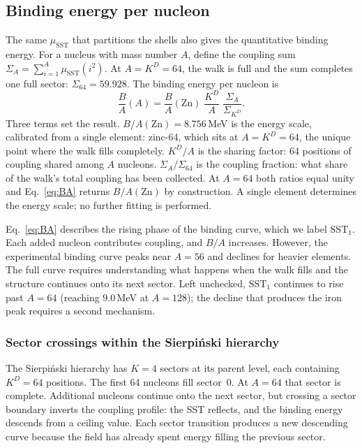 \documentclass[fleqn,usenatbib]{mnras}
\begin{document}
\subsection{Binding energy per nucleon}
\label{sec:binding}

The same $\mu_{\mathrm{SST}}$ that partitions the shells also gives the quantitative binding energy. For a nucleus with mass number $A$, define the coupling sum $\Sigma_A = \sum_{i=1}^{A}\mu_{\mathrm{SST}}(i^2)$. At $A = K^D = 64$, the walk is full and the sum completes one full sector: $\Sigma_{64} = 59.928$. The binding energy per nucleon is
\begin{equation}
\frac{B}{A}(A) = \frac{B}{A}(\mathrm{Zn})\;\frac{K^D}{A}\;\frac{\Sigma_A}{\Sigma_{K^D}}.
\label{eq:BA}
\end{equation}
Three terms set the result. $B/A(\mathrm{Zn}) = 8.756$\,MeV is the energy scale, calibrated from a single element: zinc-64, which sits at $A = K^D = 64$, the unique point where the walk fills completely. $K^D/A$ is the sharing factor: 64 positions of coupling shared among $A$ nucleons. $\Sigma_A/\Sigma_{64}$ is the coupling fraction: what share of the walk's total coupling has been collected. At $A = 64$ both ratios equal unity and Eq.~\ref{eq:BA} returns $B/A(\mathrm{Zn})$ by construction. A single element determines the energy scale; no further fitting is performed.

Eq.~\ref{eq:BA} describes the rising phase of the binding curve, which we label $\mathrm{SST}_1$. Each added nucleon contributes coupling, and $B/A$ increases. However, the experimental binding curve peaks near $A = 56$ and declines for heavier elements. The full curve requires understanding what happens when the walk fills and the structure continues onto its next sector. Left unchecked, $\mathrm{SST}_1$ continues to rise past $A = 64$ (reaching $9.0$\,MeV at $A = 128$); the decline that produces the iron peak requires a second mechanism.

\subsubsection{Sector crossings within the Sierpi\'nski hierarchy}
\label{sec:faces}

The Sierpi\'nski hierarchy has $K = 4$ sectors at its parent level, each containing $K^D = 64$ positions. The first 64 nucleons fill sector~0. At $A = 64$ that sector is complete. Additional nucleons continue onto the next sector, but crossing a sector boundary inverts the coupling profile: the SST reflects, and the binding energy descends from a ceiling value. Each sector transition produces a new descending curve because the field has already spent energy filling the previous sector.
\end{document}
